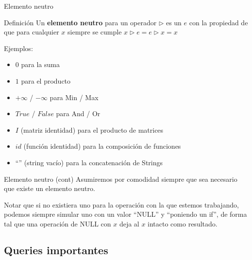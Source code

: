 \documentclass{beamer}
\begin{document}
\begin{frame}{Elemento neutro}
  \begin{block}{Definición}
    Un \textbf{elemento neutro} para un operador $\triangleright$ es un $e$ con la propiedad de que para cualquier $x$ siempre se cumple $x \triangleright e = e \triangleright x = x$
  \end{block}
  \pause
  Ejemplos:
  \begin{itemize}
  \item $0$ para la suma
  \item $1$ para el producto
  \item $+\infty$ / $-\infty$ para Min / Max
  \item $True$ / $False$ para And / Or
  \item $I$ (matriz identidad) para el producto de matrices
  \item $id$ (función identidad) para la composición de funciones
  \item ``'' (string vacío) para la concatenación de Strings
  \end{itemize}
  
\end{frame}

\begin{frame}{Elemento neutro (cont)}
  Asumiremos por comodidad siempre que sea necesario que existe un elemento neutro.
  
  Notar que si no existiera uno para la operación con la que estemos trabajando, podemos siempre simular uno con un valor ``NULL'' y ``poniendo un if'',
  de forma tal que una operación de NULL con $x$ deja al $x$ intacto como resultado.
  
\end{frame}

\subsection{Queries importantes}
\end{document}
